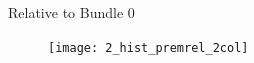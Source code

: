 \documentclass[xcolor=dvipsnames,11pt]{beamer}
\theoremstyle{definition}
\begin{document}
\begin{frame}{Relative to Bundle 0}
\begin{figure}

\texttt{[image: 2\_hist\_premrel\_2col]}
\end{figure}
\end{frame}


%
%
%
%
%
%
%
%

\end{document}
